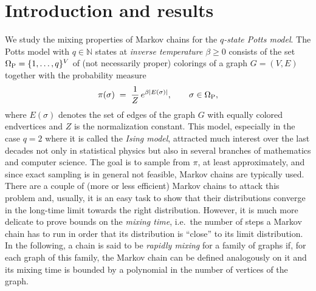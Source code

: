 \documentclass{dis}
\theoremstyle{citing}
\begin{document}
\makeabstract

\chapter{Introduction and results}

We study the mixing properties of Markov chains 
for the \emph{$q$-state Potts model}. 
The Potts model with $q\in{\ensuremath{\mathbb{N}}}$ states at 
\emph{inverse temperature} $\beta\ge0$ consists 
of the set ${{\Omega}_{\rm P}}=\{1,\dots,q\}^V$ of (not necessarily proper) 
colorings of a graph 
$G=(V,E)$ together with the probability measure 
\[
\pi(\sigma) \;=\; \frac{1}{Z}\, e^{\beta {\left\vert {E(\sigma)} \right\vert}},
	\qquad \sigma\in{\Omega}_{\rm P},
\] 
where $E(\sigma)$ denotes the 
set of edges of the graph $G$ with equally colored endvertices 
and $Z$ is the normalization constant.
This model, especially in the case $q=2$ where it is called the 
\emph{Ising model}, attracted much interest over the last decades 
not only in statistical physics but also in several branches 
of mathematics and computer science.
The goal is to sample from $\pi$, at least approximately, and 
since exact sampling is in general not feasible, 
Markov chains are typically used. 
There are a couple of (more or less efficient) Markov chains 
to attack this problem and, usually, 
it is an easy task to show that their distributions converge 
in the long-time limit towards the right distribution. 
However, it is much more delicate to prove bounds on the 
\emph{mixing time}, i.e.~the number of steps
a Markov chain has to run in order that its distribution is 
``close'' to its limit distribution. 
In the following, a chain is said to be \emph{rapidly mixing} 
for a family of graphs if, for each graph of this family, 
the Markov chain can be defined analogously on it 
and its mixing time is bounded by a polynomial in the 
number of vertices of the graph.
\end{document}
